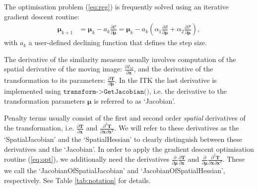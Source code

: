 \documentclass[]{article}
\newcommand{\vT}{\bm{T}}
\newcommand{\vmu}{\bm{\mu}}
\newcommand{\vx}[1][]{\bm{x}_{#1}}
\newcommand{\D}[2]{\frac{\partial #1}{\partial #2}}
\newcommand{\Dd}[3]{\frac{\partial^2 #1}{\partial #2 \partial #3}}
\begin{document}
The optimisation problem (\ref{eq:reg}) is frequently solved using
an iterative gradient descent routine:
\begin{align}
\vmu_{k+1} &= \vmu_k - a_k \frac{\partial \mathcal{C}}{\partial
\vmu} = \vmu_k - a_k \left( \alpha_1 \frac{\partial
\mathcal{S}}{\partial \vmu} + \alpha_2 \frac{\partial
\mathcal{P}}{\partial \vmu} \right),\label{eq:opt}
\end{align}
with $a_k$ a user-defined declining function that defines the step
size.

The derivative of the similarity measure usually involves
computation of the spatial derivative of the moving image:
$\D{I_M}{\vx}$, and the derivative of the transformation to its
parameters: $\D{\vT}{\vmu}$. In the ITK the last derivative is
implemented using $\texttt{transform->GetJacobian()}$, i.e. the
derivative to the transformation parameters $\vmu$ is referred to as
`Jacobian'.

Penalty terms usually consist of the first and second order
\emph{spatial} derivatives of the transformation, i.e.
$\D{\vT}{\vx}$ and $\Dd{\vT}{\vx}{\vx^T}$. We will refer to these
derivatives as the `SpatialJacobian' and the `SpatialHessian' to
clearly distinguish between these derivatives and the `Jacobian'. In
order to apply the gradient descent optimisation routine
(\ref{eq:opt}), we additionally need the derivatives $\D{}{\vmu}
\D{\vT}{\vx}$ and $\D{}{\vmu} \Dd{\vT}{\vx}{\vx^T}$. These we call
the `JacobianOfSpatialJacobian' and `JacobianOfSpatialHessian',
respectively. See Table \ref{tab:notation} for details.
\end{document}
